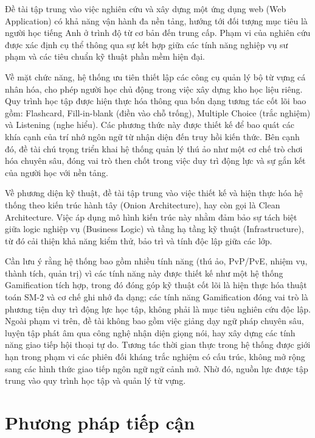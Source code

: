 Đề tài tập trung vào việc nghiên cứu và xây dựng một ứng dụng web (Web Application) có khả năng vận hành đa nền tảng, hướng tới đối tượng mục tiêu là người học tiếng Anh ở trình độ từ cơ bản đến trung cấp. Phạm vi của nghiên cứu được xác định cụ thể thông qua sự kết hợp giữa các tính năng nghiệp vụ sư phạm và các tiêu chuẩn kỹ thuật phần mềm hiện đại.

Về mặt chức năng, hệ thống ưu tiên thiết lập các công cụ quản lý bộ từ vựng cá nhân hóa, cho phép người học chủ động trong việc xây dựng kho học liệu riêng. Quy trình học tập được hiện thực hóa thông qua bốn dạng tương tác cốt lõi bao gồm: Flashcard, Fill-in-blank (điền vào chỗ trống), Multiple Choice (trắc nghiệm) và Listening (nghe hiểu). Các phương thức này được thiết kế để bao quát các khía cạnh của trí nhớ ngôn ngữ từ nhận diện đến truy hồi kiến thức. Bên cạnh đó, đề tài chú trọng triển khai hệ thống quản lý thú ảo như một cơ chế trò chơi hóa chuyên sâu, đóng vai trò then chốt trong việc duy trì động lực và sự gắn kết của người học với nền tảng.

Về phương diện kỹ thuật, đề tài tập trung vào việc thiết kế và hiện thực hóa hệ thống theo kiến trúc hành tây (Onion Architecture), hay còn gọi là Clean Architecture. Việc áp dụng mô hình kiến trúc này nhằm đảm bảo sự tách biệt giữa logic nghiệp vụ (Business Logic) và tầng hạ tầng kỹ thuật (Infrastructure), từ đó cải thiện khả năng kiểm thử, bảo trì và tính độc lập giữa các lớp.

Cần lưu ý rằng hệ thống bao gồm nhiều tính năng (thú ảo, PvP/PvE, nhiệm vụ, thành tích, quản trị) vì các tính năng này được thiết kế như một hệ thống Gamification tích hợp, trong đó đóng góp kỹ thuật cốt lõi là hiện thực hóa thuật toán SM-2 và cơ chế ghi nhớ đa dạng; các tính năng Gamification đóng vai trò là phương tiện duy trì động lực học tập, không phải là mục tiêu nghiên cứu độc lập. Ngoài phạm vi trên, đề tài không bao gồm việc giảng dạy ngữ pháp chuyên sâu, luyện tập phát âm qua công nghệ nhận diện giọng nói, hay xây dựng các tính năng giao tiếp hội thoại tự do. Tương tác thời gian thực trong hệ thống được giới hạn trong phạm vi các phiên đối kháng trắc nghiệm có cấu trúc, không mở rộng sang các hình thức giao tiếp ngôn ngữ ngữ cảnh mở. Nhờ đó, nguồn lực được tập trung vào quy trình học tập và quản lý từ vựng.

\section{Phương pháp tiếp cận}

